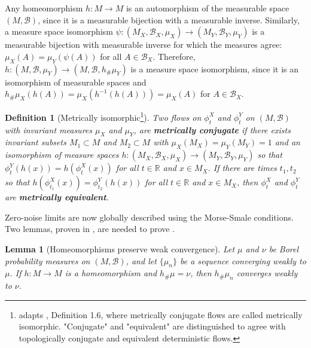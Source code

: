 \documentclass[12pt]{article}
\newtheorem{lemma}[theorem]{Lemma}
\newtheorem{definition}[theorem]{Definition}
\begin{document}
Any homeomorphism $h:M \rightarrow M$ is an automorphism of the measurable space $(M,\mathcal{B})$, since it is a measurable bijection with a measurable inverse.  Similarly, a measure space isomorphism $\psi: (M_X,\mathcal{B}_X,\mu_X) \rightarrow (M_Y,\mathcal{B}_Y,\mu_Y)$ is a measurable bijection with measurable inverse for which the measures agree: $\mu_X(A) = \mu_Y(\psi(A))$ for all $A \in \mathcal{B}_X$. Therefore, $h: (M,\mathcal{B},\mu_Y) \rightarrow (M,\mathcal{B},h_{\#}\mu_Y)$ is a measure space isomorphism, since it is an isomorphism of measurable spaces and $h_{\#}\mu_X(h(A)) = \mu_X(h^{-1}(h(A)))= \mu_X(A)$ for $A \in \mathcal{B}_X$.

\begin{definition}[Metrically isomorphic\footnote{ adapts \cite{sinai1989dynamical}, Definition 1.6, where metrically conjugate flows are called metrically isomorphic. "Conjugate" and "equivalent" are distinguished to agree with topologically conjugate and equivalent deterministic flows.}]
\label{definition:metrically-isomorphic}
    Two flows on $\phi_t^X$ and $\phi_t^Y$ on $(M,\mathcal{B})$ with invariant measures $\mu_X$ and $\mu_Y$, are \textbf{\textit{metrically conjugate}} if there exists invariant subsets $M_1 \subset M$ and $M_2 \subset M$ with $\mu_X(M_X) = \mu_Y(M_Y) = 1$ and an isomorphism of measure spaces $h:(M_X,\mathcal{B}_X, \mu_X)\rightarrow (M_Y,\mathcal{B}_Y, \mu_Y)$ so that $\phi_t^Y(h(x)) = h(\phi_t^X(x))$ for all $t \in \mathbb{R}$ and $x \in M_X$. If there are times $t_1,t_2$ so that $h(\phi_{t_1}^X(x)) = \phi_{t_2}^Y(h(x))$ for all $t \in \mathbb{R}$ and $x \in M_X$, then $\phi_t^X$ and $\phi_t^Y$ are \textbf{\textit{metrically equivalent}}.
\end{definition}

Zero-noise limits are now globally described using the Morse-Smale conditions. Two lemmas, proven in , are needed to prove .

\begin{lemma}[Homeomorphisms preserve weak convergence]
\label{lemma:strict-isomorphism-preserve-weak-convergence}
Let $\mu$ and $\nu$ be Borel probability measures on $(M,\mathcal{B})$, and let $\{\mu_n\}$ be a sequence converging weakly to $\mu$. If $h: M \rightarrow M$ is a homeomorphism and $h_{\#}\mu = \nu$, then $h_{\#}\mu_n$ converges weakly to $\nu$. 
\end{lemma}
\end{document}
